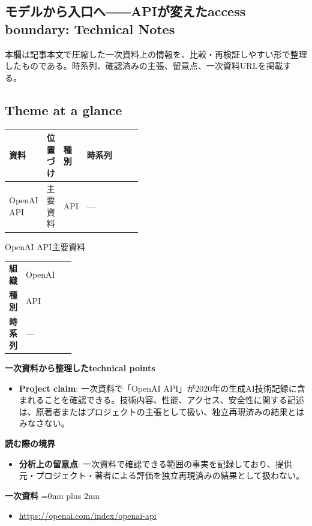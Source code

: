 \subsection*{モデルから入口へ――APIが変えたaccess boundary: Technical Notes}
本欄は記事本文で圧縮した一次資料上の情報を、比較・再検証しやすい形で整理したものである。時系列、確認済みの主張、留意点、一次資料URLを掲載する。
\medskip
\subsection*{Theme at a glance}
\begin{center}
\footnotesize
\begin{tabularx}{\linewidth}{@{}p{0.20\linewidth}p{0.10\linewidth}p{0.14\linewidth}X@{}}
\toprule
資料 & 位置づけ & 種別 & 時系列 \\
\midrule
OpenAI API & 主要資料 & API & — \\
\bottomrule
\end{tabularx}
\end{center}
\normalsize

\begin{technicalnote}{OpenAI API}{主要資料}
\begingroup
\begin{tabularx}{\linewidth}{@{}>{\bfseries}p{0.22\linewidth}X@{}}
組織 & OpenAI \\
種別 & API \\
時系列 & — \\
\end{tabularx}
\smallskip
{\bfseries 一次資料から整理したtechnical points}
\begin{itemize}[leftmargin=1.5em,itemsep=0.35em]
\item \textbf{Project claim}: 一次資料で「OpenAI API」が2020年の生成AI技術記録に含まれることを確認できる。技術内容、性能、アクセス、安全性に関する記述は、原著者またはプロジェクトの主張として扱い、独立再現済みの結果とはみなさない。
\end{itemize}
\begin{minipage}{\linewidth}
{\bfseries 読む際の境界}
\begin{itemize}[leftmargin=1.5em,itemsep=0.35em]
\item \textbf{分析上の留意点}: 一次資料で確認できる範囲の事実を記録しており、提供元・プロジェクト・著者による評価を独立再現済みの結果として扱わない。
\end{itemize}
\begin{samepage}
{\bfseries 一次資料}
\begingroup\sloppy
\Urlmuskip=0mu plus 2mu\relax
\begin{itemize}[leftmargin=1.5em,itemsep=0.25em]
\item {\scriptsize\url{https://openai.com/index/openai-api}}
\end{itemize}
\endgroup
\end{samepage}
\end{minipage}
\endgroup
\end{technicalnote}
\medskip
